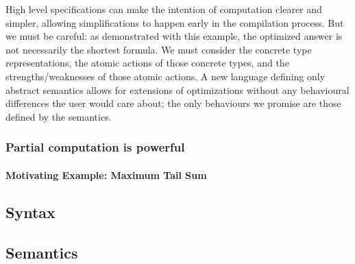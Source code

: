 \documentclass{article}
\begin{document}
High level specifications can make the intention of computation clearer and simpler, allowing simplifications to happen early in the compilation process. But we must be careful: as demonstrated with this example, the optimized answer is not necessarily the shortest formula. We must consider the concrete type representations, the atomic actions of those concrete types, and the strengths/weaknesses of those atomic actions. A new language defining only abstract semantics allows for extensions of optimizations without any behavioural differences the user would care about; the only behaviours we promise are those defined by the semantics.


\subsubsection{Partial computation is powerful}
\paragraph{Motivating Example: Maximum Tail Sum}




\subsection{Syntax}


\subsection{Semantics}

\end{document}
